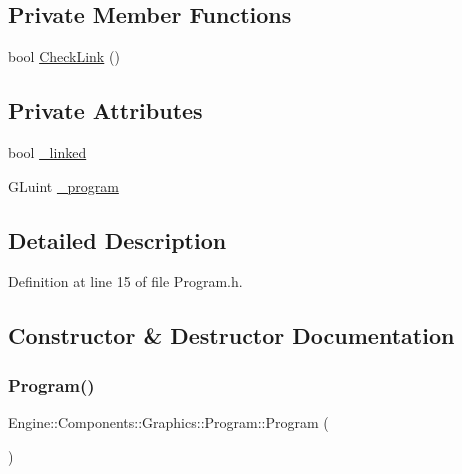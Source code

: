 \subsection*{Private Member Functions}
\begin{DoxyCompactItemize}
\item 
bool \mbox{\hyperlink{classEngine_1_1Components_1_1Graphics_1_1Program_a1f4c378d3e4663b0a41bb0c2ad4ace3f}{Check\+Link}} ()
\end{DoxyCompactItemize}
\subsection*{Private Attributes}
\begin{DoxyCompactItemize}
\item 
bool \mbox{\hyperlink{classEngine_1_1Components_1_1Graphics_1_1Program_abd46071ffae3fccf2730393cecad9646}{\+\_\+linked}}
\item 
G\+Luint \mbox{\hyperlink{classEngine_1_1Components_1_1Graphics_1_1Program_a23fb9432b8cd14e9cfa27e23f483712d}{\+\_\+program}}
\end{DoxyCompactItemize}


\subsection{Detailed Description}


Definition at line 15 of file Program.\+h.



\subsection{Constructor \& Destructor Documentation}
\mbox{\label{classEngine_1_1Components_1_1Graphics_1_1Program_ad54457a5a04a41fcfdd356a0a42427ba}} 
\subsubsection{\texorpdfstring{Program()}{Program()}}
{\footnotesize\ttfamily Engine\+::\+Components\+::\+Graphics\+::\+Program\+::\+Program (\begin{DoxyParamCaption}{ }\end{DoxyParamCaption})}



